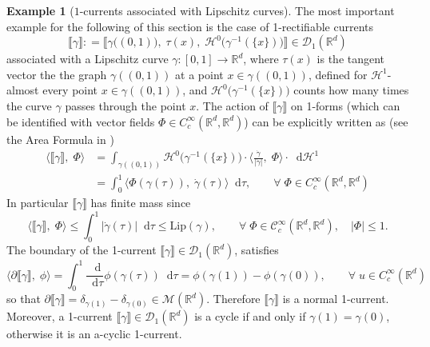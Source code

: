 \documentclass[11pt, twoside, reqno]{amsart}
\theoremstyle{definition}
\newtheorem{exmp}[thm]{Example}
\theoremstyle{remark}
\numberwithin{equation}{section}
\newcommand*\dif{\mathop{}\!\mathrm{d}}
\newcommand{\mc}[1]{\mathcal{#1}}
\newcommand{\mr}[1]{\mathrm{#1}}
\newcommand{\msc}[1]{\mathscr{#1}}
\begin{document}
\begin{exmp}[$1$-currents associated with Lipschitz curves]\label{ex:curvents}
The  most important example for the following of this section is the case of  1-rectifiable currents $$\llbracket \gamma \rrbracket : = \llbracket \gamma\big((0,1)\big) ,\; \tau(x), \; \msc H^0\big(\gamma^{-1}(\{x\})\big) \rrbracket \in \msc D_1(\mathbb R^d)$$ associated with a Lipschitz curve $\gamma: [0,1] \to \mathbb R^d$, where $\tau(x)$ is the tangent vector the the graph $\gamma((0,1))$ at a point $x \in \gamma((0,1))$, defined for $\mathscr H^1$-almost every point $x \in \gamma((0, 1))$, and
 $\msc H^0\big(\gamma^{-1}(\{x\})\big)$ counts how many times the curve $\gamma$ passes through the point $x$.  The action of $\llbracket \gamma \rrbracket$ on 1-forms (which can be identified with vector fields $\Phi \in C^\infty_c(\mathbb R^d, \mathbb R^d)$) can be explicitly written as (see the Area Formula in \cite{AFP_book})  
$$
\begin{aligned}
\langle \llbracket \gamma \rrbracket, \; \Phi \rangle & = \int_{\gamma((0, 1))}\msc H^0\big(\gamma^{-1}(\{x\})\big)\cdot  \Big\langle  \frac{\dot{\gamma}}{|\dot{\gamma}|}, \; \Phi\Big\rangle \cdot \dif \msc H^1 \\
& = \int_0^1 \langle \Phi(\gamma(\tau)), \;  \dot \gamma(\tau)\rangle  \dif \tau, \qquad \forall \; \Phi \in  C^\infty_c(\mathbb R^d, \mathbb R^d)
\end{aligned}
$$
In particular $\llbracket \gamma \rrbracket$ has finite mass since 
$$
\langle \llbracket \gamma \rrbracket, \; \Phi \rangle  \leq \int_0^1 |\dot{\gamma}(\tau)| \dif \tau  \leq \mr{Lip} (\gamma), \qquad \forall \; \Phi \in \mc C_c^{\infty}(\mathbb R^d, \mathbb R^d), \quad |\Phi| \leq 1.
$$
The boundary of the 1-current $\llbracket \gamma \rrbracket \in \msc D_1(\mathbb R^d)$, satisfies
$$
\langle \partial \llbracket \gamma \rrbracket, \; \phi \rangle  = \int_0^1 \frac{\dif}{\dif \tau} \phi(\gamma(\tau)) \dif \tau = \phi(\gamma(1))-\phi(\gamma(0)), \qquad \forall \; u \in C^\infty_c(\mathbb R^d)
$$
so that $\partial \llbracket \gamma \rrbracket = \delta_{\gamma(1)}- \delta_{\gamma(0)} \in \msc M(\mathbb R^d)$. Therefore $\llbracket \gamma \rrbracket$ is a normal 1-current. Moreover, a 1-current $\llbracket \gamma \rrbracket \in \msc D_1(\mathbb R^d)$ is a cycle if and only if $\gamma(1) = \gamma(0)$, otherwise it is an a-cyclic 1-current.
\end{exmp}
\end{document}

